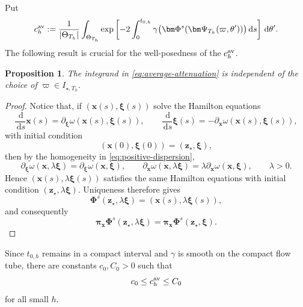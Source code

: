 \documentclass[11pt,reqno]{amsart}
\newtheorem{proposition}{Proposition}[section]
\newcommand{\dd}{\,\mathrm{d}}
\numberwithin{equation}{section}
\begin{document}
Put
\begin{equation}\label{eq:average-attenuation}
 c_h^{\rm av}:=\frac1{|\Theta_{T_h}|}\int_{\Theta_{T_h}}\exp\left[-2\int_0^{t_{0,h}}\gamma\bigl(\bm\Phi^s(\bm\Psi_{T_h}(\varpi,\theta'))\bigr)\dd s\right]
 \dd\theta'.
\end{equation}
The following result is crucial for the well-posedness of the $c_h^{\rm av}$.

\begin{proposition}
The integrand in \eqref{eq:average-attenuation} is independent of the choice of
$\varpi\in I_{\star,T_h}$.
\end{proposition}
\begin{proof}
Notice that, if $(\bm x(s),\bm\xi(s))$ solve the Hamilton equations
$$
    \frac{\dd}{\dd s}\bm x(s)=\partial_{\bm\xi}\omega(\bm x(s),\bm\xi(s)),
    \qquad
    \frac{\dd}{\dd s}\bm\xi(s)=-\partial_{\bm x}\omega(\bm x(s),\bm\xi(s)),
$$
with initial condition
$$
    (\bm x(0),\bm\xi(0))=(\bm z_\star,\bm\xi),
$$
then by the homogeneity in \eqref{eq:positive-dispersion},
$$
    \partial_{\bm\xi}\omega(\bm x,\lambda\bm\xi)=\partial_{\bm\xi}\omega(\bm x,\bm\xi), \qquad
    \partial_{\bm x}\omega(\bm x,\lambda\bm\xi)=\lambda\partial_{\bm x}\omega(\bm x,\bm\xi), \qquad \lambda>0.
$$
Hence $(\bm x(s),\lambda\bm\xi(s))$ satisfies the same Hamilton
equations with initial condition
$(\bm z_\star,\lambda\bm\xi)$. Uniqueness therefore gives
$$
    \bm\Phi^s(\bm z_\star,\lambda\bm\xi)=(\bm x(s),\lambda\bm\xi(s)),
$$
and consequently
$$
    \bm\pi_{\bm x}\bm\Phi^s(\bm z_\star,\lambda\bm\xi)=\bm\pi_{\bm x}\bm\Phi^s(\bm z_\star,\bm\xi).
$$
\end{proof}

Since $t_{0,h}$ remains in a compact interval and $\gamma$ is smooth on the compact flow tube, there are constants $c_0,C_0>0$ such that
\begin{equation*}
 c_0\le c_h^{\rm av}\le C_0
\end{equation*}
for all small $h$.
\end{document}

